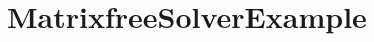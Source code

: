 \hypertarget{group___matrixfree_solver_example}{}\section{Matrixfree\+Solver\+Example}
\label{group___matrixfree_solver_example}
